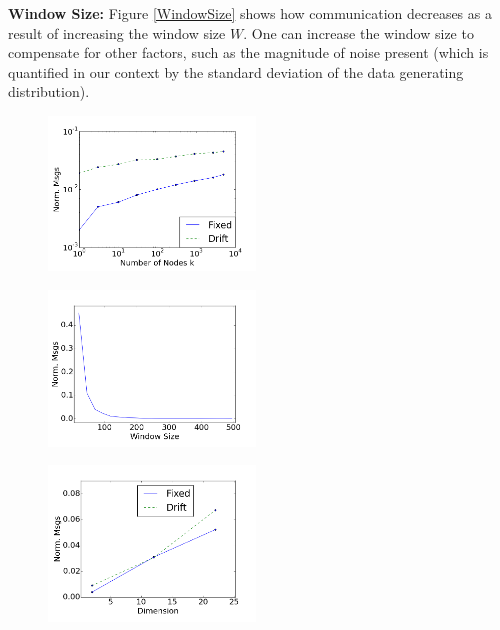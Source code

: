 \noindent\textbf{Window Size:}
Figure \ref{WindowSize} shows how communication decreases as a result
of increasing the window size $W$.  One can increase the window size to compensate 
for other factors, such as the magnitude of 
noise present (which is quantified in our context by the standard deviation of the
data generating distribution).


\begin{figure}
\centering
\begin{minipage}{.29\textwidth}
\includegraphics[width=55mm]{graphics/Nodes.png}
  \label{Nodes}
\end{minipage}%
\hfill
\begin{minipage}{.29\textwidth}
  \includegraphics[width=55mm]{graphics/WindowSize.png}
  \label{WindowSize}
\end{minipage}
\hfill
\begin{minipage}{.35\textwidth}
  \includegraphics[width=55mm]{graphics/Dimension.png}
  \label{Dimension}
\end{minipage}
\end{figure}

